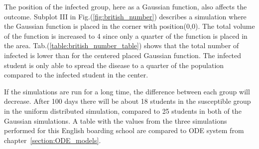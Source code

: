 \documentclass[%
twoside,                 %
final,                   %
chapterprefix=true,      %
open=right               %
10pt]{book}
\begin{document}
\vspace{3mm}




\vspace{3mm}


The position of the infected group, here as a Gaussian function, also affects the outcome. Subplot III in Fig.(\ref{fig:british_number}) describes a simulation where the Gaussian function is placed in the corner with position(0,0). The total volume of the function is increased to 4 since only a quarter of the function is placed in the area. Tab.(\ref{table:british_number_table}) shows that the total number of infected is lower than for the centered placed Gaussian function. The infected student is only able to spread the disease to a quarter of the population compared to the infected student in the center. 


\vspace{3mm}




\vspace{3mm}


If the simulations are run for a long time, the difference between each group will decrease. After 100 days there will be about 18 students in the susceptible group in the uniform distributed simulation, compared to 25 students in both of the Gaussian simulations. A table with the values from the three simulations performed for this English boarding school are compared to ODE system from chapter~\ref{section:ODE_models}.

\label{table:british_number_table}
\end{document}
